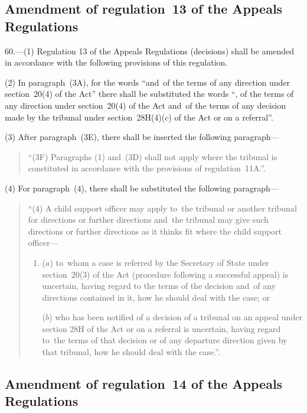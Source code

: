 \documentclass[12pt,a4paper]{article}
\begin{document}
\subsection[60. Amendment of regulation~13 of the Appeals Regulations]{Amendment of regulation~13 of the Appeals Regulations}

60.—(1) Regulation 13 of
the Appeals Regulations (decisions) shall be amended in accordance with the
following provisions of this regulation.

(2) In paragraph~(3A), for the words “and~of the terms of any direction under
section~20(4) of the Act” there shall be substituted the words “, of the terms
of any direction under section~20(4) of the Act and~of the terms of any decision
made by the tribunal under section~28H(4)($c$) of the Act or on a referral”.

(3) After paragraph~(3E), there shall be inserted the following paragraph—
\begin{quotation}
“(3F) Paragraphs (1) and~(3D) shall not apply where the tribunal is constituted
in accordance with the provisions of regulation~11A.”.
\end{quotation}

(4) For paragraph~(4), there shall be substituted the following paragraph—
\begin{quotation}
“(4) A child support officer may apply to~the tribunal or another tribunal for
directions or further directions and~the tribunal may give such directions or
further directions as it thinks fit where the child support officer—
\begin{enumerate}\item[]
($a$) to~whom a case is referred by the Secretary of State under section~20(3) of
the Act (procedure following a successful appeal) is uncertain, having regard to
the terms of the decision and~of any directions contained in it, how he should
deal with the case; or

($b$) who has been notified of a decision of a tribunal on an appeal under section
28H of the Act or on a referral is uncertain, having regard to~the terms of that
decision or of any departure direction given by that tribunal, how he should
deal with the case.”.
\end{enumerate}
\end{quotation}

\subsection[61. Amendment of regulation~14 of the Appeals Regulations]{Amendment of regulation~14 of the Appeals Regulations}
\end{document}
